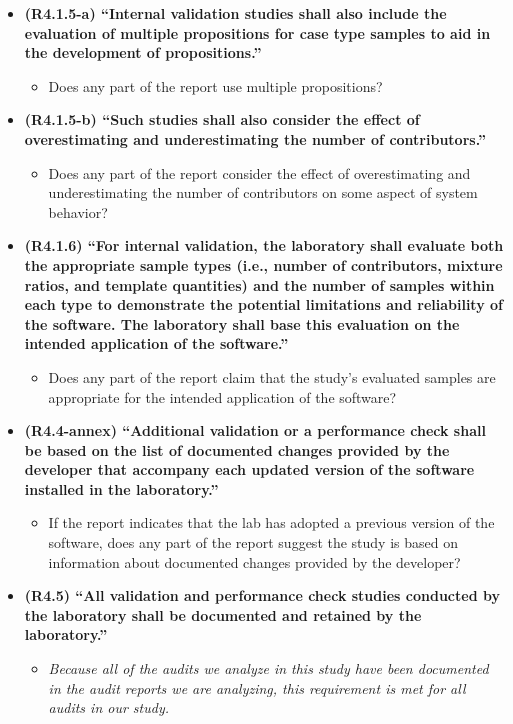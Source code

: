 \begin{itemize}
    \item \textbf{(R4.1.5-a) ``Internal validation studies shall also include the evaluation of multiple propositions for case type samples to aid in the development of propositions.''}~\cite[p.~3]{asb018}
    \begin{itemize}
        \item Does any part of the report use multiple propositions?
    \end{itemize}
    
    \item \textbf{(R4.1.5-b) ``Such studies shall also consider the effect of overestimating and underestimating the number of contributors.''}~\cite[p.~3]{asb018}
    \begin{itemize}
        \item Does any part of the report consider the effect of overestimating and underestimating the number of contributors on some aspect of system behavior?
    \end{itemize}

    \item \textbf{(R4.1.6) ``For internal validation, the laboratory shall evaluate both the appropriate sample types (i.e., number of contributors, mixture ratios, and template quantities) and the number of samples within each type to demonstrate the potential limitations and reliability of the software. The laboratory shall base this evaluation on the intended application of the software.''}~\cite[p.~3]{asb018}
    \begin{itemize}
        \item Does any part of the report claim that the study's evaluated samples are appropriate for the intended application of the software?
    \end{itemize}

    \item \textbf{(R4.4-annex) ``Additional validation or a performance check shall be based on the list of documented changes provided by the developer that accompany each updated version of the software installed in the laboratory.''}~\cite[p.~5]{asb018}
    \begin{itemize}
        \item If the report indicates that the lab has adopted a previous version of the software, does any part of the report suggest the study is based on information about documented changes provided by the developer?
    \end{itemize}

    \item \textbf{(R4.5) ``All validation and performance check studies conducted by the laboratory shall be documented and retained by the laboratory.''}~\cite[p.~4]{asb018}
    \begin{itemize}
        \item \textit{Because all of the audits we analyze in this study have been documented in the audit reports we are analyzing, this requirement is met for all audits in our study.}
    \end{itemize}
\end{itemize}



